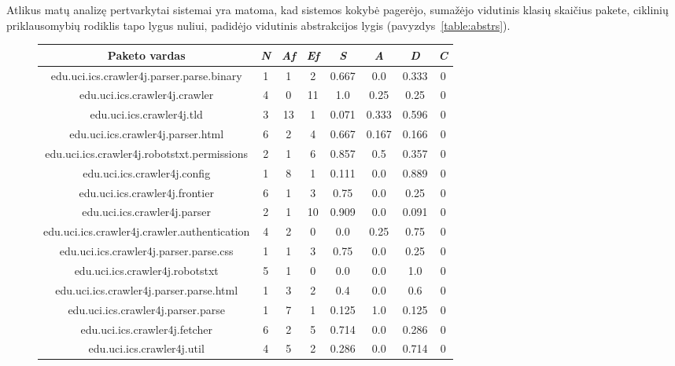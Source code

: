 Atlikus matų analizę pertvarkytai sistemai yra matoma, kad sistemos kokybė pagerėjo,
sumažėjo vidutinis klasių skaičius pakete, ciklinių priklausomybių rodiklis tapo lygus nuliui,
padidėjo vidutinis abstrakcijos lygis (pavyzdys~\ref{table:abstrs}).
\begin{figure}[H]
\begin{center}
    \begin{tabular}{|c|c|c|c|c|c|c|c|}
        \hline
        Paketo vardas & \textit{N} & \textit{Af} & \textit{Ef} & \textit{S} & \textit{A} & \textit{D} & \textit{C} \\ [0.5ex]
        \hline\hline
        edu.uci.ics.crawler4j.parser.parse.binary & 1 & 1 & 2 & 0.667 & 0.0 & 0.333 & 0 \\
        \hline
        edu.uci.ics.crawler4j.crawler & 4 & 0 & 11 & 1.0 & 0.25 & 0.25 & 0 \\
        \hline
        edu.uci.ics.crawler4j.tld & 3 & 13 & 1 & 0.071 & 0.333 & 0.596 & 0 \\
        \hline
        edu.uci.ics.crawler4j.parser.html & 6 & 2 & 4 & 0.667 & 0.167 & 0.166 & 0 \\
        \hline
        edu.uci.ics.crawler4j.robotstxt.permissions & 2 & 1 & 6 & 0.857 & 0.5 & 0.357 & 0 \\
        \hline
        edu.uci.ics.crawler4j.config & 1 & 8 & 1 & 0.111 & 0.0 & 0.889 & 0 \\
        \hline
        edu.uci.ics.crawler4j.frontier & 6 & 1 & 3 & 0.75 & 0.0 & 0.25 & 0 \\
        \hline
        edu.uci.ics.crawler4j.parser & 2 & 1 & 10 & 0.909 & 0.0 & 0.091 & 0\\
        \hline
        edu.uci.ics.crawler4j.crawler.authentication & 4 & 2 & 0 & 0.0 & 0.25 & 0.75 & 0 \\
        \hline
        edu.uci.ics.crawler4j.parser.parse.css & 1 & 1 & 3 & 0.75 & 0.0 & 0.25 & 0 \\
        \hline
        edu.uci.ics.crawler4j.robotstxt & 5 & 1 & 0 & 0.0 & 0.0 & 1.0 & 0 \\
        \hline
        edu.uci.ics.crawler4j.parser.parse.html & 1 & 3 & 2 & 0.4 & 0.0 & 0.6 & 0 \\
        \hline
        edu.uci.ics.crawler4j.parser.parse & 1 & 7 & 1 & 0.125 & 1.0 & 0.125 & 0\\
        \hline
        edu.uci.ics.crawler4j.fetcher & 6 & 2 & 5 & 0.714 & 0.0 & 0.286 & 0 \\
        \hline
        edu.uci.ics.crawler4j.util & 4 & 5 & 2 & 0.286 & 0.0 & 0.714 & 0 \\

\end{tabular}
\end{center}
\end{figure}
